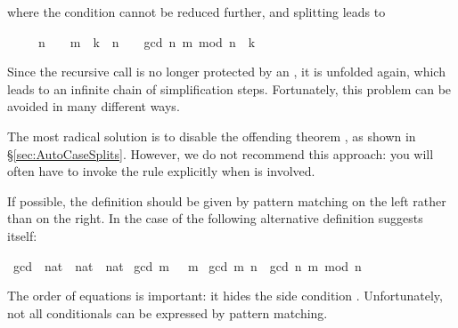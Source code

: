 \begin{isabellebody}
\begin{isamarkuptext}
\begin{isabelle}
\end{isabelle}
where the condition cannot be reduced further, and splitting leads to
\begin{isabelle}%
\ \ \ \ \ {}n\ {}\ {}\ {}\ m\ {}\ k{}\ {}\ {}n\ {}\ {}\ {}\ gcd\ n\ {}m\ mod\ n{}\ {}\ k{}%
\end{isabelle}
Since the recursive call  is no longer protected by
an , it is unfolded again, which leads to an infinite chain of
simplification steps. Fortunately, this problem can be avoided in many
different ways.

The most radical solution is to disable the offending theorem
,
as shown in \S\ref{sec:AutoCaseSplits}.  However, we do not recommend this
approach: you will often have to invoke the rule explicitly when
 is involved.

If possible, the definition should be given by pattern matching on the left
rather than  on the right. In the case of  the
following alternative definition suggests itself:%
\end{isamarkuptext}%
\isamarkuptrue%
\isamarkupfalse%
\ gcd{}\ {}{}\ {}nat\ {}\ nat\ {}\ nat{}\ \isanewline
{}gcd{}\ m\ {}\ {}\ m{}\ {}\isanewline
{}gcd{}\ m\ n\ {}\ gcd{}\ n\ {}m\ mod\ n{}{}%
\begin{isamarkuptext}%
\noindent
The order of equations is important: it hides the side condition
.  Unfortunately, not all conditionals can be
expressed by pattern matching.


\end{isamarkuptext}
\end{isabellebody}
